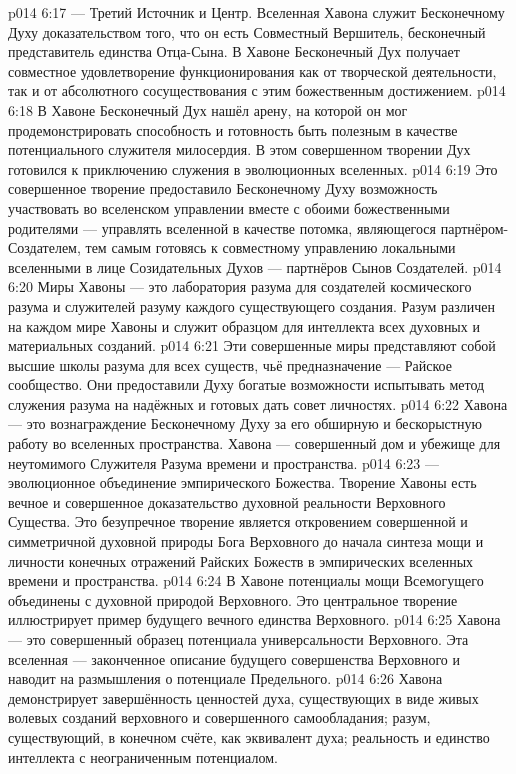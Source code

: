 \vs p014 6:17  --- Третий Источник и Центр. Вселенная Хавона служит Бесконечному Духу доказательством того, что он есть Совместный Вершитель, бесконечный представитель единства Отца\hyp{}Сына. В Хавоне Бесконечный Дух получает совместное удовлетворение функционирования как от творческой деятельности, так и от абсолютного сосуществования с этим божественным достижением.
\vs p014 6:18 В Хавоне Бесконечный Дух нашёл арену, на которой он мог продемонстрировать способность и готовность быть полезным в качестве потенциального служителя милосердия. В этом совершенном творении Дух готовился к приключению служения в эволюционных вселенных.
\vs p014 6:19 Это совершенное творение предоставило Бесконечному Духу возможность участвовать во вселенском управлении вместе с обоими божественными родителями --- управлять вселенной в качестве потомка, являющегося партнёром\hyp{}Создателем, тем самым готовясь к совместному управлению локальными вселенными в лице Созидательных Духов --- партнёров Сынов Создателей.
\vs p014 6:20 Миры Хавоны --- это лаборатория разума для создателей космического разума и служителей разуму каждого существующего создания. Разум различен на каждом мире Хавоны и служит образцом для интеллекта всех духовных и материальных созданий.
\vs p014 6:21 Эти совершенные миры представляют собой высшие школы разума для всех существ, чьё предназначение --- Райское сообщество. Они предоставили Духу богатые возможности испытывать метод служения разума на надёжных и готовых дать совет личностях.
\vs p014 6:22 Хавона --- это вознаграждение Бесконечному Духу за его обширную и бескорыстную работу во вселенных пространства. Хавона --- совершенный дом и убежище для неутомимого Служителя Разума времени и пространства.
\vs p014 6:23  --- эволюционное объединение эмпирического Божества. Творение Хавоны есть вечное и совершенное доказательство духовной реальности Верховного Существа. Это безупречное творение является откровением совершенной и симметричной духовной природы Бога Верховного до начала синтеза мощи и личности конечных отражений Райских Божеств в эмпирических вселенных времени и пространства.
\vs p014 6:24 В Хавоне потенциалы мощи Всемогущего объединены с духовной природой Верховного. Это центральное творение иллюстрирует пример будущего вечного единства Верховного.
\vs p014 6:25 Хавона --- это совершенный образец потенциала универсальности Верховного. Эта вселенная --- законченное описание будущего совершенства Верховного и наводит на размышления о потенциале Предельного.
\vs p014 6:26 Хавона демонстрирует завершённость ценностей духа, существующих в виде живых волевых созданий верховного и совершенного самообладания; разум, существующий, в конечном счёте, как эквивалент духа; реальность и единство интеллекта с неограниченным потенциалом.
